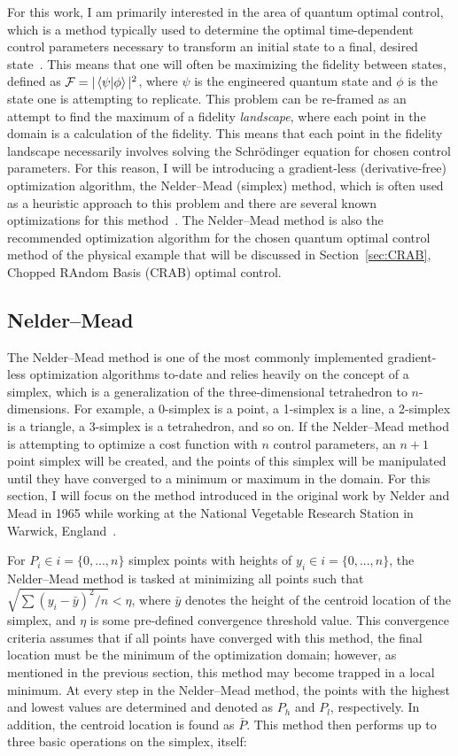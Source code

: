 For this work, I am primarily interested in the area of quantum optimal control, which is a method typically used to determine the optimal time-dependent control parameters necessary to transform an initial state to a final, desired state~\cite{werschnik2007}.
This means that one will often be maximizing the fidelity between states, defined as $\mathcal{F} = |\braket{\psi|\phi}|^2$, where $\psi$ is the engineered quantum state and $\phi$ is the state one is attempting to replicate.
This problem can be re-framed as an attempt to find the maximum of a fidelity \textit{landscape}, where each point in the domain is a calculation of the fidelity.
This means that each point in the fidelity landscape necessarily involves solving the Schr\"odinger equation for chosen control parameters.
For this reason, I will be introducing a gradient-less (derivative-free) optimization algorithm, the Nelder--Mead (simplex) method, which is often used as a heuristic approach to this problem and there are several known optimizations for this method~\cite{nelder1965,kolda2003,lewis2007}.
The Nelder--Mead method is also the recommended optimization algorithm for the chosen quantum optimal control method of the physical example that will be discussed in Section~\ref{sec:CRAB}, Chopped RAndom Basis (CRAB) optimal control.

\subsection{Nelder--Mead}
\label{sec:NM}

The Nelder--Mead method is one of the most commonly implemented gradient-less optimization algorithms to-date and relies heavily on the concept of a simplex, which is a generalization of the three-dimensional tetrahedron to $n$-dimensions.
For example, a 0-simplex is a point, a 1-simplex is a line, a 2-simplex is a triangle, a 3-simplex is a tetrahedron, and so on.
If the Nelder--Mead method is attempting to optimize a cost function with $n$ control parameters, an $n+1$ point simplex will be created, and the points of this simplex will be manipulated until they have converged to a minimum or maximum in the domain.
For this section, I will focus on the method introduced in the original work by Nelder and Mead in 1965 while working at the National Vegetable Research Station in Warwick, England~\cite{nelder1965}.

For $P_i \in i=\{0,...,n\}$ simplex points with heights of $y_i \in i=\{0,...,n\}$, the Nelder--Mead method is tasked at minimizing all points such that $\sqrt{\sum(y_i-\bar y)^2/n} < \eta$, where $\bar y$ denotes the height of the centroid location of the simplex, and $\eta$ is some pre-defined convergence threshold value.
This convergence criteria assumes that if all points have converged with this method, the final location must be the minimum of the optimization domain; however, as mentioned in the previous section, this method may become trapped in a local minimum.
At every step in the Nelder--Mead method, the points with the highest and lowest values are determined and denoted as $P_h$ and $P_l$, respectively.
In addition, the centroid location is found as $\bar P$.
This method then performs up to three basic operations on the simplex, itself:

